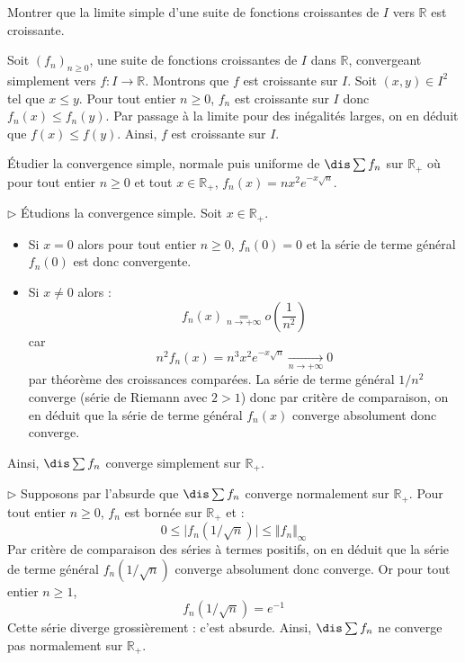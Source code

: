 \documentclass[a4paper,10pt]{report}
\begin{document}
\begin{Exercice}{} Montrer que la limite simple d'une suite de fonctions croissantes de $I$ vers $\mathbb{R}$ est croissante.
\end{Exercice}

\corr Soit $(f_n)_{n \geq 0}$, une suite de fonctions croissantes de $I$ dans $\mathbb{R}$, convergeant simplement vers $f : I \rightarrow \mathbb{R}$. Montrons que $f$ est croissante sur $I$. Soit $(x,y) \in I^2$ tel que $x \leq y$. Pour tout entier $n \geq 0$, $f_n$ est croissante sur $I$ donc $f_n(x) \leq f_n(y)$. Par passage à la limite pour des inégalités larges, on en déduit que $f(x) \leq f(y)$. Ainsi, $f$ est croissante sur $I$.


\begin{Exercice}{} Étudier la convergence simple, normale puis uniforme de $\dis \sum f_n$ sur $\mathbb{R}_+$ où pour tout entier $n \geq 0$ et tout $x \in \mathbb{R}_+$, $f_n(x) = nx^2e^{-x\sqrt{n}}.$
\end{Exercice} 

\corr 

\noindent $\rhd$ Étudions la convergence simple. Soit $x \in \mathbb{R}_+$.

\begin{itemize}
\item Si $x=0$ alors pour tout entier $n \geq 0$, $f_n(0)=0$ et la série de terme général $f_n(0)$ est donc convergente.
\item Si $x \neq 0$ alors :
$$ f_n(x) \underset{n \rightarrow + \infty}{=} o \left( \dfrac{1}{n^2} \right)$$
car 
$$ n^2f_n(x) = n^3x^2e^{-x\sqrt{n}} \underset{n \rightarrow + \infty}{\longrightarrow} 0$$
par théorème des croissances comparées. La série de terme général $1/n^2$ converge (série de Riemann avec $2>1$) donc par critère de comparaison, on en déduit que la série de terme général $f_n(x)$ converge absolument donc converge.
\end{itemize}
Ainsi, $\dis \sum f_n$ converge simplement sur $\mathbb{R}_+$.

\medskip

\noindent $\rhd$ Supposons par l'absurde que $\dis \sum f_n$ converge normalement sur $\mathbb{R}_+$. Pour tout entier $n \geq 0$, $f_n$ est bornée sur $\mathbb{R}_+$ et :
$$ 0 \leq \vert f_n(1/\sqrt{n}) \vert \leq \Vert f_n \Vert_{\infty}$$
Par critère de comparaison des séries à termes positifs, on en déduit que la série de terme général $f_n(1/\sqrt{n})$ converge absolument donc converge. Or pour tout entier $n \geq 1$,
 $$ f_n(1/\sqrt{n}) = e^{-1}$$
Cette série diverge grossièrement : c'est absurde. Ainsi, $\dis \sum f_n$ ne converge pas normalement sur $\mathbb{R}_+$.
\end{document}

